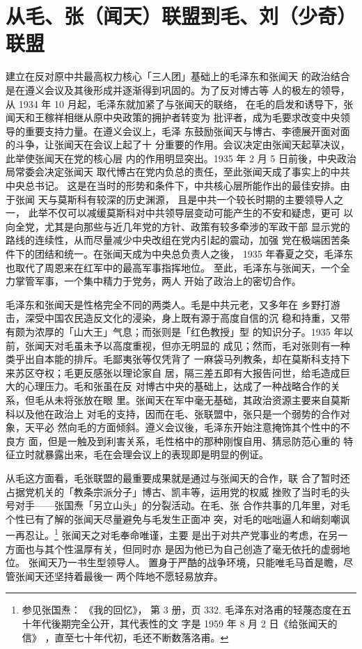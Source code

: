 \section{从毛、张（闻天）联盟到毛、刘（少奇）联盟}
建立在反对原中共最高权力核心「三人团」基础上的毛泽东和张闻天
的政治结合是在遵义会议及其後形成并逐渐得到巩固的。为了反对博古等
人的极左的领导，从 1934 年 10 月起，毛泽东就加紧了与张闻天的联络，
在毛的启发和诱导下，张闻天和王稼祥相继从原中央政策的拥护者转变为
批评者，成为毛要求改变中央领导的重要支持力量。在遵义会议上，毛泽
东鼓励张闻天与博古、李德展开面对面的斗争，让张闻天在会议上起了十
分重要的作用。会议决定由张闻天起草决议，此举使张闻天在党的核心层
内的作用明显突出。1935 年 2 月 5 日前後，中央政治局常委会决定张闻天
取代博古在党内负总的责任，至此张闻天成了事实上的中共中央总书记。
这是在当时的形势和条件下，中共核心层所能作出的最佳安排。由于张闻
天与莫斯科有较深的历史渊源，
且是中共一个较长时期的主要领导人之一，
此举不仅可以减缓莫斯科对中共领导层变动可能产生的不安和疑虑，更可
以向全党，尤其是向那些与近几年党的方针、政策有较多牵涉的军政干部
显示党的路线的连续性，从而尽量减少中央改组在党内引起的震动，加强
党在极端困苦条件下的团结和统一。在张闻天成为中央总负责人之後，
1935 年春夏之交，毛泽东也取代了周恩来在红军中的最高军事指挥地位。
至此，毛泽东与张闻天，一个全力掌管军事，一个集中精力于党务，两人
开始了政治上的密切合作。
 
毛泽东和张闻天是性格完全不同的两类人。毛是中共元老，又多年在
乡野打游击，深受中国农民造反文化的浸染，身上既有源于高度自信的沉
稳和持重，又带有颇为浓厚的「山大王」气息；而张则是「红色教授」型
的知识分子。1935 年以前，张闻天对毛虽未予以高度重视，但亦无明显的
成见；然而，毛对张则有一种类乎出自本能的排斥。毛鄙夷张等仅凭背了
一麻袋马列教条，却在莫斯科支持下来苏区夺权；毛更反感张以理论家自
居，隔三差五即有大报告问世，给毛造成巨大的心理压力。毛和张虽在反
对博古中央的基础上，达成了一种战略合作的关系，但毛从未将张放在眼
里。张闻天在军中毫无基础，其政治资源主要来自莫斯科以及他在政治上
对毛的支持，因而在毛、张联盟中，张只是一个弱势的合作对象，天平必
然向毛的方面倾斜。遵义会议後，毛泽东开始注意掩饰其个性中的不良方
面，但是一触及到利害关系，毛性格中的那种刚愎自用、猜忌防范心重的
特征立时就暴露出来，毛在会理会议上的表现即是明显的例证。
 
从毛这方面看，毛张联盟的最重要成果就是通过与张闻天的合作，联
合了暂时还占据党机关的「教条宗派分子」博古、凯丰等，运用党的权威
挫败了当时毛的头号对手——张国焘「另立山头」的分裂活动。在毛、张
合作共事的几年里，对毛个性已有了解的张闻天尽量避免与毛发生正面冲
突，对毛的咄咄逼人和峭刻嘲讽一再忍让。\footnote{参见张国焘：
《我的回忆》，
第 3 册，页 332. 毛泽东对洛甫的轻蔑态度在五十年代後期完全公开，其代表性的文
字是 1959 年 8 月 2 日《给张闻天的信》
，直至七十年代初，毛还不断数落洛甫。} 张闻天之对毛奉命唯谨，主要
是出于对共产党事业的考虑，在另一方面也与其个性温厚有关，但同时亦
是因为他已为自己创造了毫无依托的虚弱地位。
张闻天乃一书生型领导人。
置身于严酷的战争环境，只能唯毛马首是瞻，尽管张闻天还坚持着最後一
两个阵地不愿轻易放弃。

